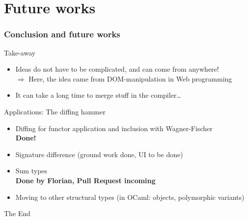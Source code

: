 \documentclass[11pt,aspectratio=169]{beamer}
\begin{document}
\section{Future works}

\begin{frame}\frametitle{Conclusion and future works}
  \begin{block}{Take-away}
    \begin{itemize}
      \item Ideas do not have to be complicated, and can come from anywhere!\\
        $\Rightarrow$ Here, the idea came from DOM-manipulation in Web programming
      \item It can take a long time to merge stuff in the compiler\dots
  \end{itemize}
\end{block}

\begin{block}{Applications: The diffing hammer}
  \begin{itemize}
  \item Diffing for functor application and inclusion with Wagner-Fischer\\
    {\bf Done!}
  \item Signature difference (ground work done, UI to be done)
  \item Sum types\\
    {\bf Done by Florian, Pull Request incoming}
  \item Moving to other structural types (in OCaml: objects, polymorphic variants)
  \end{itemize}
\end{block}
\end{frame}

\begin{frame}[standout]
  \centering \Huge The End
\end{frame}
\end{document}
